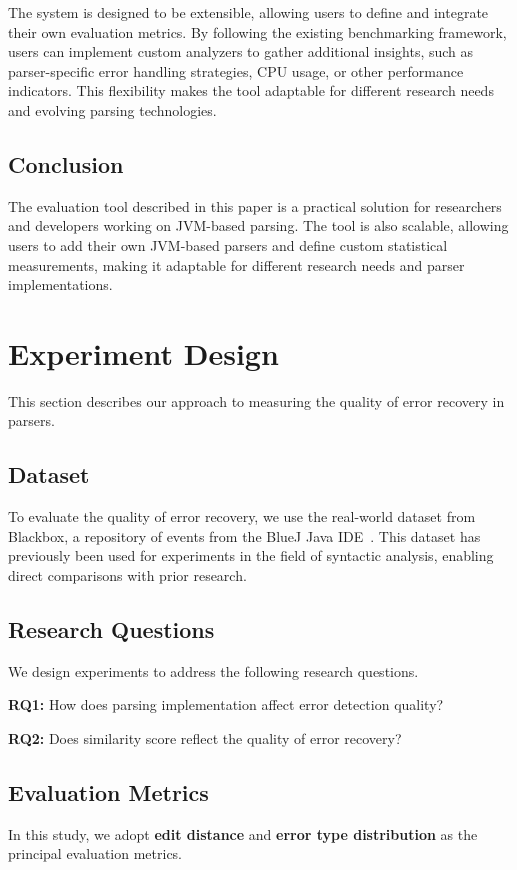 \documentclass[conference]{IEEEtran}
\begin{document}
The system is designed to be extensible, allowing users to define and integrate their own evaluation metrics. By following the existing benchmarking framework, users can implement custom analyzers to gather additional insights, such as parser-specific error handling strategies, CPU usage, or other performance indicators. This flexibility makes the tool adaptable for different research needs and evolving parsing technologies.


\subsection{Conclusion}
The evaluation tool described in this paper is a practical solution for researchers and developers working on JVM-based parsing. The tool is also scalable, allowing users to add their own JVM-based parsers and define custom statistical measurements, making it adaptable for different research needs and parser implementations.


\section{Experiment Design}
This section describes our approach to measuring the quality of error recovery in parsers.

\subsection{Dataset}
To evaluate the quality of error recovery, we use the real-world dataset from Blackbox, a repository of events from the BlueJ Java IDE~\cite{bluej}. This dataset has previously been used for experiments in the field of syntactic analysis\cite{panic,ai_recovery, ide-errors}, enabling direct comparisons with prior research.

\subsection{Research Questions}
We design experiments to address the following research questions.

\textbf{RQ1:} How does parsing implementation affect error detection quality?

\textbf{RQ2:} Does similarity score reflect the quality of error recovery?

\subsection{Evaluation Metrics}
In this study, we adopt \textbf{edit distance} and \textbf{error type distribution} as the principal evaluation metrics. 
\end{document}
